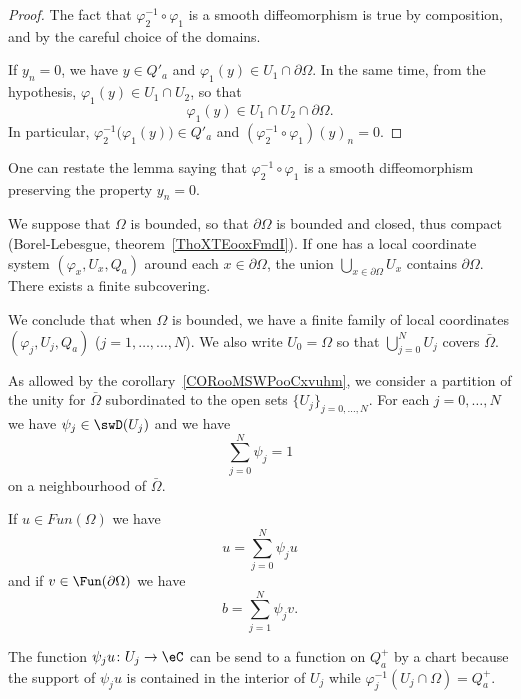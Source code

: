\begin{proof}
	The fact that \( \varphi_2^{-1}\circ\varphi_1\) is a smooth diffeomorphism is true by composition, and by the careful choice of the domains.

	If \( y_n=0\), we have \( y\in Q'_a\) and \( \varphi_1(y)\in U_1\cap \partial\Omega\). In the same time, from the hypothesis, \( \varphi_1(y)\in U_1\cap U_2\), so that
	\begin{equation}
		\varphi_1(y)\in U_1\cap U_2\cap\partial\Omega.
	\end{equation}
	In particular, \( \varphi_2^{-1}\big( \varphi_1(y) \big)\in Q'_a\) and \( (\varphi_2^{-1}\circ\varphi_1)(y)_n=0\).
\end{proof}
One can restate the lemma saying that \( \varphi_2^{-1}\circ\varphi_1\) is a smooth diffeomorphism preserving the property \( y_n=0\).

\begin{normaltext}
	We suppose that \( \Omega\) is bounded, so that \( \partial\Omega\) is bounded and closed, thus compact (Borel-Lebesgue, theorem~\ref{ThoXTEooxFmdI}). If one has a local coordinate system \( (\varphi_x,U_x,Q_a)\) around each \( x\in \partial\Omega\), the union \( \bigcup_{x\in\partial \Omega}U_x\) contains \( \partial\Omega\). There exists a finite subcovering.

	We conclude that when \( \Omega\) is bounded, we have a finite family of local coordinates \( (\varphi_j,U_j,Q_a)\) (\( j=1,\ldots,\ldots, N\)). We also write \( U_0=\Omega\) so that \( \bigcup_{j=0}^NU_j\) covers \( \bar\Omega\).
\end{normaltext}

As allowed by the corollary~\ref{CORooMSWPooCxvuhm}, we consider a partition of the unity for \( \bar\Omega\) subordinated to the open sets \( \{ U_j \}_{j=0,\ldots, N}\). For each \( j=0,\ldots, N\) we have \( \psi_j\in\swD(U_j)\) and we have
\begin{equation}
	\sum_{j=0}^{N}\psi_j=1
\end{equation}
on a neighbourhood of \( \bar\Omega\).

If \( u\in Fun(\Omega)\) we have
\begin{equation}
	u=\sum_{j=0}^N\psi_ju
\end{equation}
and if \( v\in\Fun(\partial\Omega)\) we have
\begin{equation}
	b=\sum_{j=1}^N\psi_jv.
\end{equation}

The function \( \psi_ju\colon U_j\to \eC\) can be send to a function on \( Q_a^+\) by a chart because the support of \( \psi_ju\) is contained in the interior of \( U_j\) while \( \varphi_j^{-1}(U_j\cap\Omega)=Q_a^+\).

